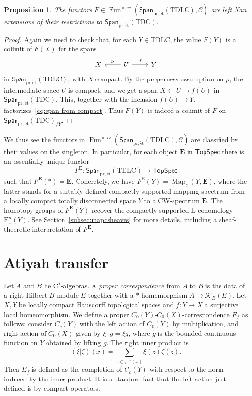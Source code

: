 \documentclass[a4paper,reqno]{amsart}
\theoremstyle{plain}
\newtheorem{proposition}[theorem]{Proposition}
\theoremstyle{definition}
\theoremstyle{remark}
\numberwithin{equation}{section}
\newcommand{\rE}{\mathrm{E}}
\newcommand{\cC}{\mathcal{C}}
\newcommand{\cK}{\mathcal{K}}
\newcommand{\bE}{\mathbf{E}}
\newcommand{\TopSpec}{\mathsf{TopSpec}}
\newcommand{\Span}{\mathsf{Span}}
\newcommand{\pret}{\mathrm{pr,\acute{e}t}}
\newcommand{\TDLC}{\mathrm{TDLC}}
\newcommand{\TDC}{\mathrm{TDC}}
\DeclareMathOperator{\Fun}{Fun}
\DeclareMathOperator{\Map}{Map}
\begin{document}
\begin{proposition}\label{prop:comp-supp-cont-functors-as-Lan}
The functors $F \in \Fun^{\times,cc}(\Span_{\pret}(\TDLC), \cC)$ are left Kan extensions of their restrictions to $\Span_{\pret}(\TDC)$.
\end{proposition}

\begin{proof}
Again we need to check that, for each $Y \in \TDLC$, the value $F(Y)$ is a colimit of $F(X)$ for the spans
\begin{equation}\label{eq:span-from-compact}
\begin{tikzcd}
X & U \arrow[l, "p"'] \arrow[r, "f"] & Y
\end{tikzcd}
\end{equation}
in $\Span_{\pret}(\TDLC)$, with $X$ compact.
By the properness assumption on $p$, the intermediate space $U$ is compact, and we get a span $X \leftarrow U \to f(U)$ in $\Span_{\pret}(\TDC)$.
This, together with the inclusion $f(U) \to Y$, factorizes~\eqref{eq:span-from-compact}.
Thus $F(Y)$ is indeed a colimit of $F$ on $\Span_{\pret}(\TDC)_{/Y}$.
\end{proof}

We thus see the functors in $\Fun^{\times,cc}(\Span_{\pret}(\TDLC), \cC)$ are classified by their values on the singleton. 
In particular, for each object $\bE$ in $\TopSpec$ there is an essentially unique functor
\begin{equation}\label{eq:fe}
F^\bE\colon \Span_{\pret}(\TDLC)\to \TopSpec
\end{equation}
such that $F^\bE(\ast)=\bE$.
Concretely, we have $F^\bE(Y) = \Map_c(Y,\bE)$, where the latter stands for a suitably defined compactly-supported mapping spectrum from a locally compact totally disconnected space $Y$ to a CW-spectrum $\bE$.
The homotopy groups of $F^\bE(Y)$ recover the compactly supported $\rE$-cohomology $\rE^n_c(Y)$.
See Section~\ref{subsec:mapcsheaves} for more details, including a sheaf-theoretic interpretation of $F^{\bE}$.

\section{Atiyah transfer}\label{sec:k-theory-transfer}

Let $A$ and $B$ be C$^*$-algebras. A \emph{proper correspondence} from $A$ to $B$ is the data of a right Hilbert $B$-module $E$ together with a $*$-homomorphism $A \to \cK_B(E)$.
Let $X,Y$ be locally compact Hausdorff topological spaces and $f\colon Y\to X$ a surjective local homeomorphism.
We define a proper $C_0(Y)$-$C_0(X)$-correspondence $E_f$ as follows: consider $C_c(Y)$ with the left action of $C_0(Y)$ by multiplication, and right action of $C_0(X)$ given by $\xi\cdot g= \xi \tilde{g}$, where $\tilde{g}$ is the bounded continuous function on $Y$ obtained by lifting $g$.
The right inner product is 
\[
(\xi|\zeta) (x)= \sum_{z\in f^{-1}(x)} \bar{\xi}(z)\zeta(z).
\]
Then $E_f$ is defined as the completion of $C_c(Y)$ with respect to the norm induced by the inner product.
It is a standard fact that the left action just defined is by compact operators. 
\end{document}
